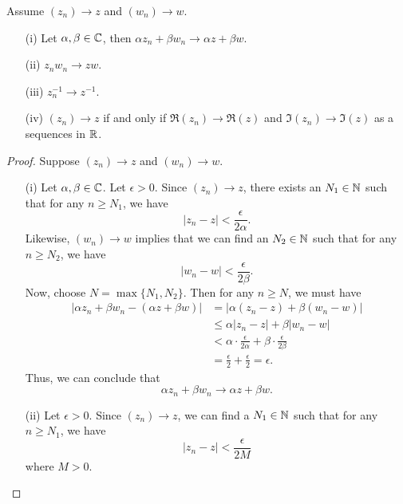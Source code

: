 \documentclass[a4paper]{report}
\begin{document}
\begin{prop}
   Assume \( ({z}_{n}) \to z  \) and \( ({w}_{n}) \to w   \). 
   \begin{enumerate}
       \item[(i)] Let \( \alpha, \beta \in \mathbb{C}  \), then \( \alpha {z}_{n} + \beta {w}_{n} \to \alpha z + \beta w  \).
        \item[(ii)] \( {z}_{n} {w}_{n} \to zw  \).
        \item[(iii)] \( {z}_{n}^{-1} \to z^{-1} \).
        \item[(iv)] \( ({z}_{n}) \to z  \) if and only if \( \Re({z}_{n}) \to \Re(z) \) and \( \Im({z}_{n}) \to \Im(z) \) as a sequences in \( \mathbb{R}  \).
   \end{enumerate}
\end{prop}
\begin{proof}
Suppose \( ({z}_{n}) \to z  \) and \( ({w}_{n}) \to w  \).
\begin{enumerate}
    \item[(i)] Let \( \alpha, \beta \in \mathbb{C}   \). Let \( \epsilon > 0  \). Since \( ({z}_{n}) \to z  \), there exists an \( {N}_{1} \in \mathbb{N}  \) such that for any \( n \geq {N}_{1} \), we have  
        \[  | {z}_{n} - z  |  < \frac{ \epsilon  }{ 2 \alpha }. \]
        Likewise, \( ({w}_{n}) \to w  \) implies that we can find an \( {N}_{2} \in \mathbb{N}  \) such that for any \( n \geq {N}_{2} \), we have
        \[  | {w}_{n} - w  |  < \frac{ \epsilon  }{ 2 \beta }. \]
        Now, choose \( N = \max \{ {N}_{1}, {N}_{2} \}  \). Then for any \( n \geq N  \), we must have 
        \begin{align*}
            | \alpha {z}_{n} + \beta {w}_{n} - (\alpha z + \beta w ) | &= |  \alpha ({z}_{n} - z ) + \beta ({w}_{n} - w )  |   \\
                                                                       &\leq \alpha | {z}_{n} - z | + \beta | {w}_{n} - w  | \\
                                                                       &< \alpha \cdot \frac{ \epsilon  }{ 2 \alpha }  + \beta \cdot \frac{ \epsilon  }{  2 \beta } \\
                                                                       &= \frac{ \epsilon  }{  2 }  + \frac{ \epsilon }{ 2 }  = \epsilon.
        \end{align*}
        Thus, we can conclude that 
        \[  \alpha {z}_{n} + \beta {w}_{n} \to \alpha z + \beta w.  \]
    \item[(ii)] Let \( \epsilon > 0  \). Since \( ({z}_{n}) \to z  \), we can find a \( {N}_{1} \in \mathbb{N}  \) such that for any \( n \geq {N}_{1} \), we have   
        \[  | {z}_{n} - z  |  < \frac{ \epsilon  }{  2 M   }   \]
        where \( M > 0  \).
\end{enumerate}
\end{proof}
\end{document}
